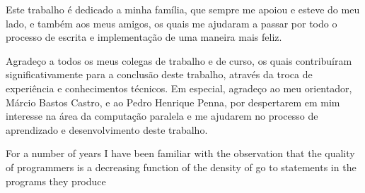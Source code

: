 \newcommand{\mppa}{MPPA-256\xspace}
\newcommand{\capb}{CAP Bench\xspace}
\newcommand{\epiphany}{Adapteva Epiphany\xspace}
\newcommand{\manycore}{\textit{manycore}\xspace}
\newcommand{\manycores}{\textit{manycores}\xspace}
\newcommand{\bench}{\textit{benchmark}\xspace}


\imprimircapa%
\imprimirfolhaderosto*


\begin{dedicatoria}
  Este trabalho é dedicado a minha família, que sempre me apoiou e esteve do meu lado, e também aos meus amigos, os quais me ajudaram a passar por todo o processo de escrita e implementação de uma maneira mais feliz.
\end{dedicatoria}


\begin{agradecimentos}
  Agradeço a todos os meus colegas de trabalho e de curso, os quais contribuíram significativamente para a conclusão deste trabalho, através da troca de experiência e conhecimentos técnicos. Em especial, agradeço ao meu orientador, Márcio Bastos Castro, e ao Pedro Henrique Penna, por despertarem em mim interesse na área da computação paralela e me ajudarem no processo de aprendizado e desenvolvimento deste trabalho.
\end{agradecimentos}


\begin{epigrafe}
  For a number of years I have been familiar with the observation that the quality of programmers is a decreasing function of the density of go to statements in the programs they produce \\
  \cite{dijkstra1968}
\end{epigrafe}


